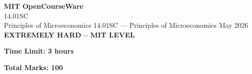 \documentclass[12pt,a4paper]{exam}
\begin{document}
\begin{center}
{\LARGE \textbf{MIT OpenCourseWare}}\\14.01SC\\Principles of Microeconomics
\vspace{0.5cm}
{14.01SC} --- {Principles of Microeconomics}
\vspace{0.3cm}
May 2026
\vspace{0.3cm}
\textbf{EXTREMELY HARD -- MIT LEVEL}
\end{center}

\begin{center}
\textbf{Time Limit: 3 hours}
\end{center}

\begin{center}
\textbf{Total Marks: 100}
\end{center}

\vspace{0.5cm}
\end{document}
